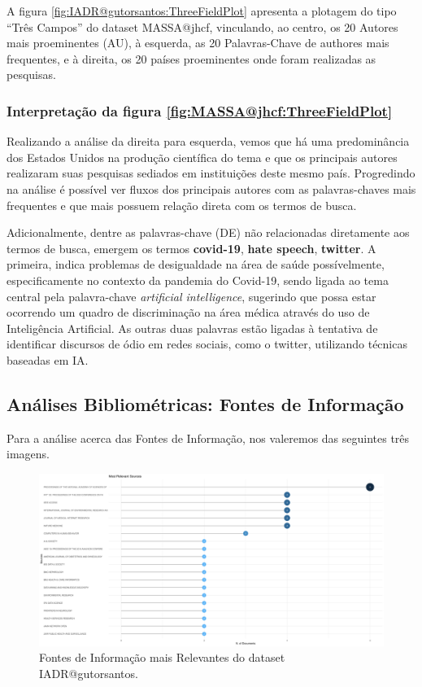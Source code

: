 A figura \ref{fig:IADR@gutorsantos:ThreeFieldPlot} apresenta a plotagem do tipo ``Três Campos'' do dataset MASSA@jhcf, vinculando, ao centro, os 20 Autores mais proeminentes (AU), à esquerda, as 20 Palavras-Chave de authores mais frequentes, e à direita, os 20 países proeminentes onde foram realizadas as pesquisas.

\subsubsection{Interpretação da figura \ref{fig:MASSA@jhcf:ThreeFieldPlot}}
Realizando a análise da direita para esquerda, vemos que há uma predominância dos Estados Unidos na produção científica do tema e que os principais autores realizaram suas pesquisas sediados em instituições deste mesmo país. Progredindo na análise é possível ver fluxos dos principais autores com as palavras-chaves mais frequentes e que mais possuem relação direta com os termos de busca.

Adicionalmente, dentre as palavras-chave (DE) não relacionadas diretamente aos termos de busca, emergem os termos \textbf{covid-19}, \textbf{hate speech}, \textbf{twitter}. A primeira, indica problemas de desigualdade na área de saúde possívelmente, especificamente no contexto da pandemia do Covid-19, sendo ligada ao tema central pela palavra-chave \textit{artificial intelligence}, sugerindo que possa estar ocorrendo um quadro de discriminação na área médica através do uso de Inteligência Artificial. As outras duas palavras estão ligadas à tentativa de identificar discursos de ódio em redes sociais, como o twitter, utilizando técnicas baseadas em IA.

\subsection{Análises Bibliométricas: Fontes de Informação}

Para a análise acerca das Fontes de Informação, nos valeremos das seguintes três imagens.

\begin{figure}[H]
    \centering
    \includegraphics[angle=0,width=1\textwidth]{experiments/gutorsantos/AnaliseBibliometrica/IAeDiscriminacao/imgs/MostRelevantSources-2022-02-09.png}
    \caption{Fontes de Informação mais Relevantes do dataset IADR@gutorsantos.}
    \label{fig:IADR@gutorsantos:RelevantSources}
\end{figure}

